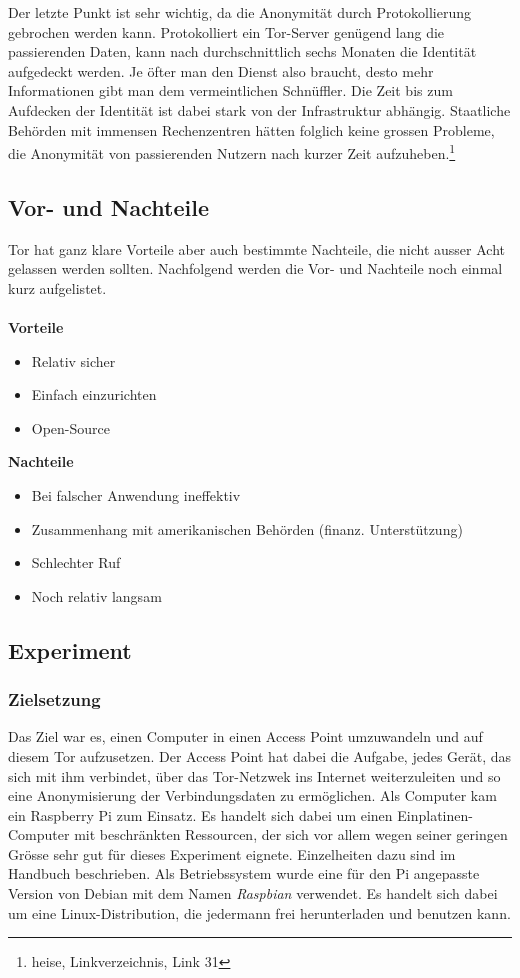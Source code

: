Der letzte Punkt ist sehr wichtig, da die Anonymität durch Protokollierung gebrochen werden kann. Protokolliert ein Tor-Server genügend lang die passierenden Daten, kann nach durchschnittlich sechs Monaten die Identität aufgedeckt werden. Je öfter man den Dienst also braucht, desto mehr Informationen gibt man dem vermeintlichen Schnüffler. Die Zeit bis zum Aufdecken der Identität ist dabei stark von der Infrastruktur abhängig. Staatliche Behörden mit immensen Rechenzentren hätten folglich keine grossen Probleme, die Anonymität von passierenden Nutzern nach kurzer Zeit aufzuheben.\footnote{heise, Linkverzeichnis, Link 31}

\subsection{Vor- und Nachteile}
Tor hat ganz klare Vorteile aber auch bestimmte Nachteile, die nicht ausser Acht gelassen werden sollten.
Nachfolgend werden die Vor- und Nachteile noch einmal kurz aufgelistet.
\\
\\

\textbf{Vorteile}
\begin{itemize}
\item Relativ sicher
\item Einfach einzurichten
\item Open-Source
\end{itemize}

\textbf{Nachteile}
\begin{itemize}
\item Bei falscher Anwendung ineffektiv
\item Zusammenhang mit amerikanischen Behörden (finanz. Unterstützung)
\item Schlechter Ruf
\item Noch relativ langsam
\end{itemize}

\subsection{Experiment}

\subsubsection{Zielsetzung}
Das Ziel war es, einen Computer in einen Access Point umzuwandeln und auf diesem Tor aufzusetzen.
Der Access Point hat dabei die Aufgabe, jedes Gerät, das sich mit ihm verbindet, über das Tor-Netzwek ins Internet weiterzuleiten und so eine Anonymisierung der Verbindungsdaten zu ermöglichen.
Als Computer kam ein Raspberry Pi zum Einsatz.
Es handelt sich dabei um einen Einplatinen-Computer mit beschränkten Ressourcen, der sich vor allem wegen seiner geringen Grösse sehr gut für dieses Experiment eignete.
Einzelheiten dazu sind im Handbuch beschrieben.
Als Betriebssystem wurde eine für den Pi angepasste Version von Debian mit dem Namen \textit{Raspbian} verwendet.
Es handelt sich dabei um eine Linux-Distribution, die jedermann frei herunterladen und benutzen kann.

